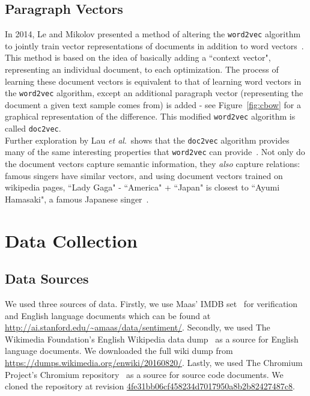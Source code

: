 \documentclass[11pt]{article}
\def\etal{\emph{et al}.\ }
\begin{document}
\subsection*{Paragraph Vectors}
In 2014, Le and Mikolov presented a method of altering the \texttt{word2vec}
algorithm to jointly train vector representations of documents in addition
to word vectors~\cite{le2014distributed}. This method is based on the idea of
basically adding a ``context vector", representing an individual document, to
each optimization. The process of learning these document vectors is equivalent
to that of learning word vectors in the \texttt{word2vec} algorithm, except an
additional paragraph vector (representing the document a given text sample comes
from) is added - see Figure~\ref{fig:cbow} for a graphical representation of the
difference. This modified \texttt{word2vec} algorithm is called
\texttt{doc2vec}.\\
Further exploration by Lau \etal shows that the \texttt{doc2vec} algorithm
provides many of the same interesting properties that \texttt{word2vec} can
provide~\cite{lau2016empirical}. Not only do the document vectors capture
semantic information, they \textit{also} capture relations: famous singers
have similar vectors, and using document vectors trained on wikipedia
pages, ``Lady Gaga" - ``America" + ``Japan" is closest to ``Ayumi Hamasaki",
a famous Japanese singer~\cite{dai2015document}.

\section*{Data Collection}

\subsection*{Data Sources}
We used three sources of data. Firstly, we use Maas' IMDB set~\cite{maas2011}
for verification and English language documents which can be found at
\url{http://ai.stanford.edu/~amaas/data/sentiment/}. Secondly, we used The
Wikimedia Foundation's English Wikipedia data dump~\cite{wikidatadump2016} as
a source for English language documents. We downloaded the full wiki dump from
\url{https://dumps.wikimedia.org/enwiki/20160820/}. Lastly, we used The
Chromium Project's Chromium repository~\cite{chromium2016} as a source for
source code documents. We cloned the repository at revision
\href{https://github.com/nwjs/chromium.src/commit/4fe31bb06cf458234d7017950a8b2b82427487c8}
{4fe31bb06cf458234d7017950a8b2b82427487c8}.
\end{document}
